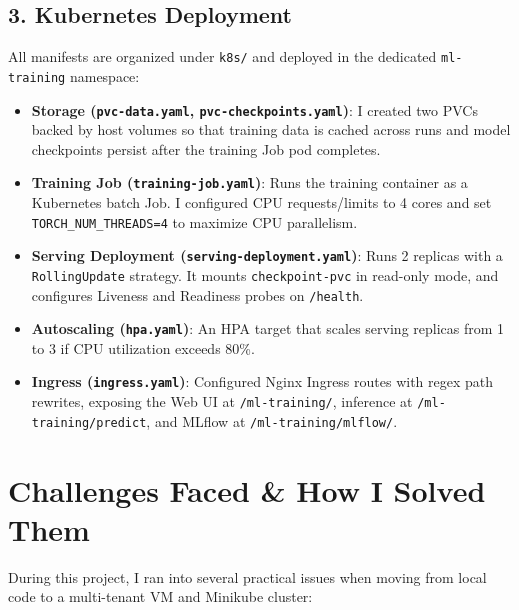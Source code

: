 \documentclass[11pt,a4paper]{article}
\begin{document}
\subsection{3. Kubernetes Deployment}
All manifests are organized under \texttt{k8s/} and deployed in the dedicated \texttt{ml-training} namespace:
\begin{itemize}[noitemsep]
    \item \textbf{Storage (\texttt{pvc-data.yaml}, \texttt{pvc-checkpoints.yaml})}: I created two PVCs backed by host volumes so that training data is cached across runs and model checkpoints persist after the training Job pod completes.
    \item \textbf{Training Job (\texttt{training-job.yaml})}: Runs the training container as a Kubernetes batch Job. I configured CPU requests/limits to 4 cores and set \texttt{TORCH\_NUM\_THREADS=4} to maximize CPU parallelism.
    \item \textbf{Serving Deployment (\texttt{serving-deployment.yaml})}: Runs 2 replicas with a \texttt{RollingUpdate} strategy. It mounts \texttt{checkpoint-pvc} in read-only mode, and configures Liveness and Readiness probes on \texttt{/health}.
    \item \textbf{Autoscaling (\texttt{hpa.yaml})}: An HPA target that scales serving replicas from 1 to 3 if CPU utilization exceeds 80\%.
    \item \textbf{Ingress (\texttt{ingress.yaml})}: Configured Nginx Ingress routes with regex path rewrites, exposing the Web UI at \texttt{/ml-training/}, inference at \texttt{/ml-training/predict}, and MLflow at \texttt{/ml-training/mlflow/}.
\end{itemize}

\section{Challenges Faced \& How I Solved Them}

During this project, I ran into several practical issues when moving from local code to a multi-tenant VM and Minikube cluster:
\end{document}
